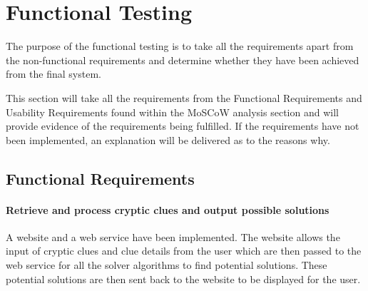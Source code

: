\section{Functional Testing}
\label{sec:functional_testing}

The purpose of the functional testing is to take all the requirements apart from
the non-functional requirements and determine whether they have been achieved
from the final system. 

This section will take all the requirements from the Functional Requirements and
Usability Requirements found within the MoSCoW analysis section and will provide
evidence of the requirements being fulfilled. If the requirements have not been 
implemented, an explanation will be delivered as to the reasons why.


\subsection{Functional Requirements}
\label{sub:test_func_func}


\paragraph{Retrieve and process cryptic clues and output possible solutions}

A website and a web service have been implemented. The website allows the input
of cryptic clues and clue details from the user which are then passed to the web
service  for all the solver algorithms to find potential solutions. These
potential solutions are then  sent back to the website to be displayed for the
user.

